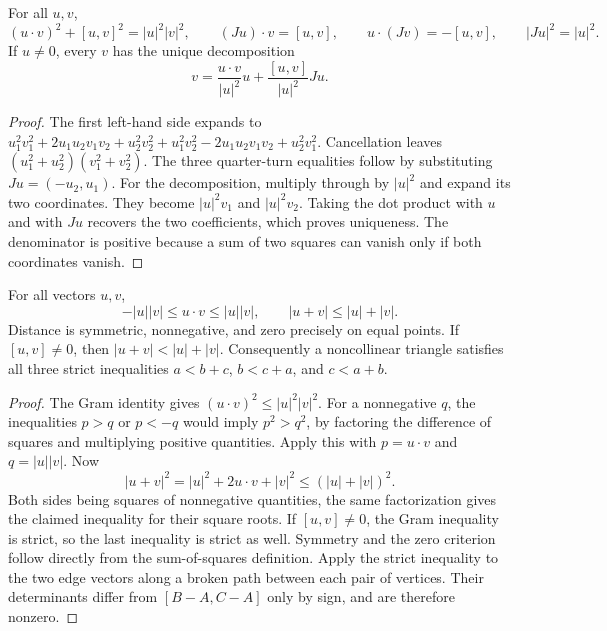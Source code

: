 \begin{lemma}
\label{tri:gram}
For all $u,v$,
\[
 (u\mathbin{\cdot}v)^2+[u,v]^2=|u|^2|v|^2,\qquad
 (Ju)\mathbin{\cdot}v=[u,v],\qquad
 u\mathbin{\cdot}(Jv)=-[u,v],\qquad |Ju|^2=|u|^2.
\]
If $u\ne0$, every $v$ has the unique decomposition
\[
 v=\frac{u\mathbin{\cdot}v}{|u|^2}u+
   \frac{[u,v]}{|u|^2}Ju.
\]
\end{lemma}
\begin{proof}
The first left-hand side expands to
$u_1^2v_1^2+2u_1u_2v_1v_2+u_2^2v_2^2+
u_1^2v_2^2-2u_1u_2v_1v_2+u_2^2v_1^2$.
Cancellation leaves $(u_1^2+u_2^2)(v_1^2+v_2^2)$.
The three quarter-turn equalities follow by substituting $Ju=(-u_2,u_1)$.
For the decomposition, multiply through by $|u|^2$ and expand its two
coordinates.  They become $|u|^2v_1$ and $|u|^2v_2$.
Taking the dot product with $u$ and with $Ju$ recovers the two coefficients,
which proves uniqueness.  The denominator is positive because a sum of two
squares can vanish only if both coordinates vanish.
\end{proof}

\begin{theorem}
\label{tri:metric}
For all vectors $u,v$,
\[
 -|u||v|\le u\mathbin{\cdot}v\le |u||v|,
 \qquad |u+v|\le |u|+|v|.
\]
Distance is symmetric, nonnegative, and zero precisely on equal points.
If $[u,v]\ne0$, then $|u+v|<|u|+|v|$.
Consequently a noncollinear triangle satisfies all three strict inequalities
$a<b+c$, $b<c+a$, and $c<a+b$.
\end{theorem}
\begin{proof}
The Gram identity gives $(u\mathbin{\cdot}v)^2\le |u|^2|v|^2$.
For a nonnegative $q$, the inequalities $p>q$ or $p<-q$ would imply
$p^2>q^2$, by factoring the difference of squares and multiplying positive
quantities.  Apply this with $p=u\mathbin{\cdot}v$ and $q=|u||v|$.
Now
\[
 |u+v|^2=|u|^2+2u\mathbin{\cdot}v+|v|^2
 \le (|u|+|v|)^2.
\]
Both sides being squares of nonnegative quantities, the same factorization
gives the claimed inequality for their square roots.  If $[u,v]\ne0$,
the Gram inequality is strict, so the last inequality is strict as well.
Symmetry and the zero criterion follow directly from the sum-of-squares
definition.  Apply the strict inequality to the two edge vectors along a
broken path between each pair of vertices.  Their determinants differ from
$[B-A,C-A]$ only by sign, and are therefore nonzero.
\end{proof}


